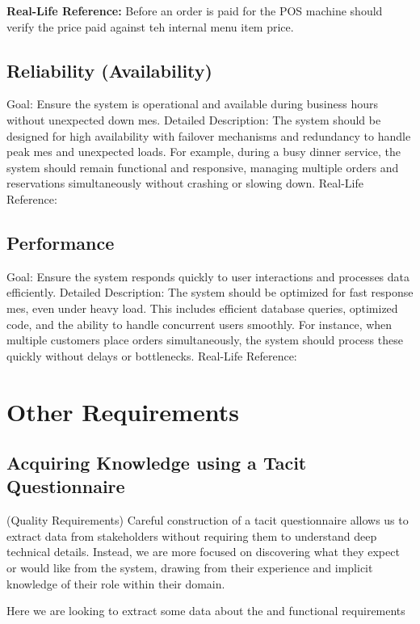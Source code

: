 \documentclass{article}
\begin{document}
\textbf{Real-Life Reference: }  Before an order is paid for the POS machine should verify the price paid against teh internal menu item price.
\subsection{Reliability (Availability)} 
Goal: Ensure the system is operational and available during business hours without 
unexpected down mes. 
Detailed Description: The system should be designed for high availability with failover 
mechanisms and redundancy to handle peak mes and unexpected loads. For example, 
during a busy dinner service, the system should remain functional and responsive, managing 
multiple orders and reservations simultaneously without crashing or slowing down. 
Real-Life Reference:  
\subsection{Performance}
Goal: Ensure the system responds quickly to user interactions and processes data efficiently. 
Detailed Description: The system should be optimized for fast response mes, even under 
heavy load. This includes efficient database queries, optimized code, and the ability to 
handle concurrent users smoothly. For instance, when multiple customers place orders 
simultaneously, the system should process these quickly without delays or bottlenecks. 
Real-Life Reference:  





\section{Other Requirements}
\subsection{Acquiring Knowledge using a Tacit Questionnaire}(Quality Requirements)
Careful construction of a tacit questionnaire allows us to extract data from stakeholders without requiring them to understand deep technical details. Instead, we are more focused on discovering what they expect or would like from the system, drawing from their experience and implicit knowledge of their role within their domain.

Here we are looking to extract some data about the and functional requirements
\end{document}
